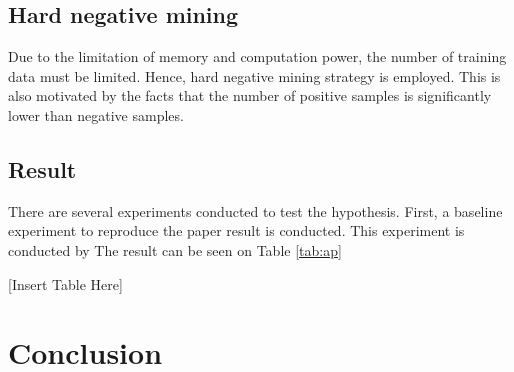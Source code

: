 \documentclass[a4paper]{article}
\begin{document}
\subsection{Hard negative mining}
Due to the limitation of memory and computation power, the number of training data must be limited. Hence, hard negative mining strategy is employed. This is also motivated by the facts that the number of positive samples is significantly lower than negative samples.

\subsection{Result}
There are several experiments conducted to test the hypothesis. First, a baseline experiment to reproduce the paper result is conducted. This experiment is conducted by 
The result can be seen on Table \ref{tab:ap}

[Insert Table Here]

\section{Conclusion}
\label{seg:conclusion}



\end{document}
